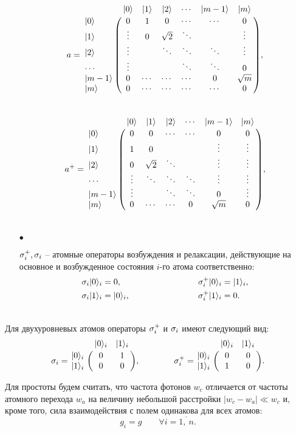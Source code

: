 \begin{itemize}
{		\begin{equation}
			a =
			\bordermatrix{
				& |0\ra & |1\ra & |2\ra & \cdots & |m-1\ra & |m\ra \cr
				|0\ra & 0 & 1 & 0 & \cdots & \cdots & 0 \cr
				|1\ra & \vdots & 0 & \sqrt{2} & \ddots &  & \vdots \cr
				|2\ra & \vdots &  & \ddots & \ddots & \ddots & \vdots \cr
				\cdots & \vdots &  &  & \ddots & \ddots & 0 \cr
				|m-1\ra & 0 & \cdots & \cdots & \cdots & 0 & \sqrt{m} \cr
				|m\ra & 0 & \cdots & \cdots & \cdots & \cdots & 0\cr
			},
		\end{equation}
	}\\[12pt]
	\begin{equation}
		a^{+} =
		\bordermatrix{
			& |0\ra & |1\ra & |2\ra & \cdots & |m-1\ra & |m\ra \cr
			|0\ra & 0 & 0 & \cdots & \cdots & 0 & 0 \cr
			|1\ra & 1 & 0 &  &  & \vdots & \vdots \cr
			|2\ra & 0 & \sqrt{2} & \ddots & & \vdots & \vdots \cr
			\cdots & \vdots & \ddots & \ddots & \ddots & \vdots & \vdots \cr
			|m-1\ra & \vdots &  & \ddots & \ddots & 0 & \vdots \cr
			|m\ra & 0 & \cdots & \cdots & 0 & \sqrt{m} & 0\cr
		},
	\end{equation}
	\\
	\item[$\bullet$]{$\sigma^{+}_{i}, \sigma_{i}$ -- атомные операторы возбуждения и релаксации, действующие на основное и возбужденное состояния $i$-го атома соответственно:\\
		\begin{equation}
			\begin{split}
				\sigma_{i}|0\rangle_{i} = 0,\hspace{9em}\sigma^{+}_{i}|0\rangle_{i} = |1\rangle_{i},\\
				\sigma_{i}|1\rangle_{i} = |0\rangle_{i},\hspace{8em}\sigma^{+}_{i}|1\rangle_{i} = 0.\hspace{1em}
			\end{split}
		\end{equation}
		
	}
\end{itemize}
\
\\[12pt]
Для двухуровневых атомов операторы $\sigma^{+}_{i}$ и $\sigma_{i}$ имеют следующий вид:
\begin{equation}
	\s_{i} = \bordermatrix{
		& |0\ra_{i} & |1\ra_{i} \cr 
		|0\ra_{i} & 0 & 1 \cr 
		|1\ra_{i} & 0 & 0 \cr
	},
	\qquad\qquad
	\s_{i}^{+} = \bordermatrix{ 
		& |0\ra_{i} & |1\ra_{i} \cr
		|0\ra_{i} & 0 & 0 \cr
		|1\ra_{i} & 1 & 0 \cr 
	}.
\end{equation}

Для простоты будем считать, что частота фотонов $w_{c}$ отличается от частоты атомного перехода $w_{a}$ на величину небольшой расстройки $|w_{c} - w_{a}| \ll w_{c}$ и, кроме того, сила взаимодействия с полем одинакова для всех атомов:
\[
g_{i} = g\qquad\forall i = \overline{1,~n}.
\]

